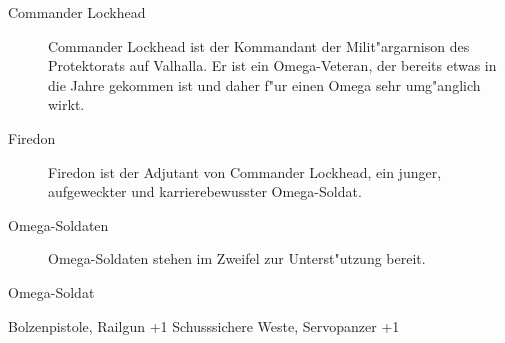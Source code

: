 
\begin{description}
    \item[Commander Lockhead] Commander Lockhead ist der Kommandant der Milit"argarnison des Protektorats auf Valhalla. Er ist ein 
        Omega-Veteran, der bereits etwas in die Jahre gekommen ist und daher f"ur einen Omega sehr umg"anglich wirkt.
    \item[Firedon] Firedon ist der Adjutant von Commander Lockhead, ein junger, aufgeweckter und karrierebewusster Omega-Soldat.
    \item[Omega-Soldaten] Omega-Soldaten stehen im Zweifel zur Unterst"utzung bereit.
\end{description}

\begin{nscsheet}{Omega-Soldat}
    \nscstats[ATT=3,AGG=2,CON=2]
    \nscruler
    \begin{nscinventory}
        \nscitem[Waffen] Bolzenpistole, Railgun +1
        \nscitem[R"ustung] Schusssichere Weste, Servopanzer +1
    \end{nscinventory}
\end{nscsheet}
